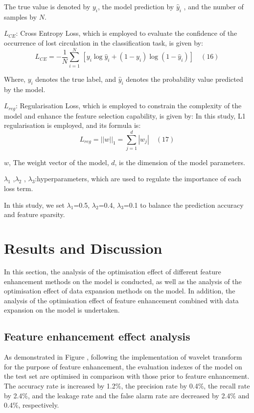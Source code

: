 \documentclass[journal,article,submit,pdftex,moreauthors]{Definitions/mdpi}
\begin{document}
The true value is denoted by \({ y } _ { i } \), the model prediction by \(\widehat { y } _ { i }\) , and the number of samples by \(N\).


\(L _ { CE}\): Cross Entropy Loss, which is employed to evaluate the confidence of the occurrence of lost circulation in the classification task, is given by:
\[{{L}_{CE}}=-\frac{1}{N}\underset{i=1}{\overset{N}{\mathop \sum }}\,\left[ {{y}_{i}}\log {{{\hat{y}}}_{i}}+(1-{{y}_{i}})\log (1-{{{\hat{y}}}_{i}}) \right]\quad (16)\]

Where, \({y}_{i}\) denotes the true label, and \({\hat{y}}_{i}\) denotes the probability value predicted by the model.

\({L}_{reg
}\): Regularisation Loss, which is employed to constrain the complexity of the model and enhance the feature selection capability, is given by: In this study, L1 regularisation is employed, and its formula is:
$$ L _ { r e g } = | | w | | _ { 1 } = \sum _ { j = 1 } ^ { d } | w _ { j } |\quad (17)$$

\(w\), The weight vector of the model, \(d\), is the dimension of the model parameters.

\({{\lambda }_{1}}\) ,\({{\lambda }_{2}}\) , \({{\lambda }_{3}}\):hyperparameters, which are used to regulate the importance of each loss term. 

In this study, we set \({{\lambda }_{1}}\)=0.5, \({{\lambda }_{2}}\)=0.4, \({{\lambda }_{3}}\)=0.1 to balance the prediction accuracy and feature sparsity.

\section{Results and Discussion}

In this section, the analysis of the optimisation effect of different feature enhancement methods on the model is conducted, as well as the analysis of the optimisation effect of data expansion methods on the model. In addition, the analysis of the optimisation effect of feature enhancement combined with data expansion on the model is undertaken.

\subsection{Feature enhancement effect analysis}

As demonstrated in Figure \label{fig:Evaluation of feature enhancement effects}, following the implementation of wavelet transform for the purpose of feature enhancement, the evaluation indexes of the model on the test set are optimised in comparison with those prior to feature enhancement. The accuracy rate is increased by 1.2\%, the precision rate by 0.4\%, the recall rate by 2.4\%, and the leakage rate and the false alarm rate are decreased by 2.4\% and 0.4\%, respectively.
\end{document}
